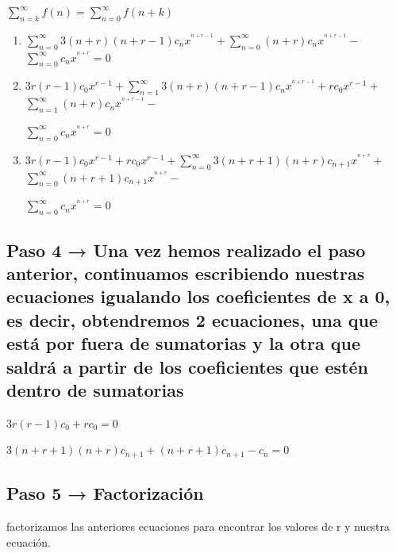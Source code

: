 \documentclass{article}
\begin{document}
\begin{center}
\Large $\sum_{n=k}^{\infty} f(n) = $$\sum_{n=0}^{\infty} f (n + k)$\newline
\end{center}

\begin{enumerate}
\item\Large $\sum_{n=0}^{\infty} $$ 3 (n + r) (n + r - 1) c_{n}x^{^{n+r-1}} + $$\sum_{n=0}^{\infty}$$(n + r) c_{n}x^{^{n+r-1}} - $$\sum_{n=0}^{\infty} c_{n}x^{^{n+r}}=0$\newline

\item\large  $ 3r (r-1) c_{0} x^{r-1} + $$\sum_{n=1}^{\infty}$$ 3 (n + r) (n + r - 1) c_{n}x^{^{n+r-1}} + rc_{0} x^{r-1} +$$\sum_{n=1}^{\infty}$$ (n  + r) c_{n}x^{^{n+r-1}} - $
\begin{center}
$\sum_{n=0}^{\infty}$$c_{n}x^{^{n+r}}=0$\newline
\end{center}

\item\large $3r (r-1) c_{0} x^{r-1} + rc_{0}x^{r-1} +$$\sum_{n=0}^{\infty}$$3 (n + r + 1) (n + r) c_{n+1}x^{^{n+r}} +$$\sum_{n=0}^{\infty}$$ (n + r + 1) c_{n+1}x^{^{n+r}} -$
\begin{center}
$\sum_{n=0}^{\infty}$$c_{n}x^{^{n+r}}=0$\newline
\end{center}
\end{enumerate}

\subsection{Paso 4 → Una vez hemos realizado el paso anterior, continuamos escribiendo nuestras ecuaciones igualando los coeficientes de x a 0, es decir, obtendremos 2 ecuaciones, una que está por fuera de sumatorias y la otra que saldrá a partir de los coeficientes que estén dentro de sumatorias}

\begin{center}
\Large $ 3r (r - 1) c_{0} + rc_{0} = 0 $
\end{center}

\begin{center}
\Large$ 3 (n + r + 1) (n + r) c_{n+1} + (n + r + 1)c_{n+1} - c_{n} = 0 $
\end{center}

\subsection{ Paso 5 → Factorización}
\large  factorizamos las anteriores ecuaciones para encontrar los valores de r y nuestra ecuación.
\end{document}
